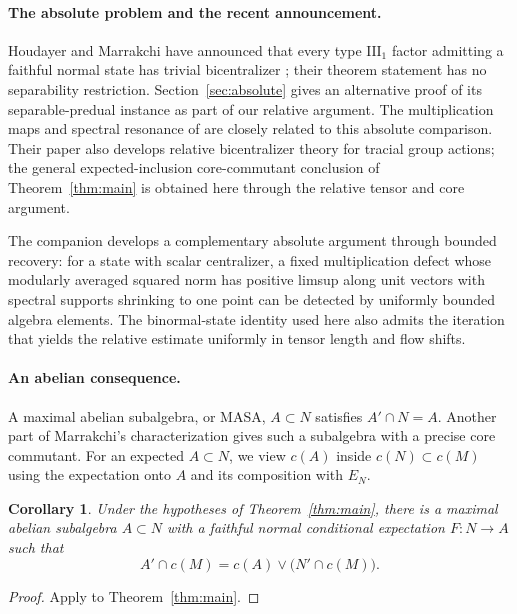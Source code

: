 \documentclass[11pt]{article}
\newtheorem{corollary}[theorem]{Corollary}
\theoremstyle{definition}
\begin{document}
\paragraph{The absolute problem and the recent announcement.}
Houdayer and Marrakchi have announced that every type $\mathrm{III}_1$
factor admitting a faithful normal state has trivial bicentralizer
\cite[Theorem~G]{HoudayerMarrakchi2026}; their theorem statement has no
separability restriction. Section~\ref{sec:absolute} gives an alternative
proof of its separable-predual instance as part of our relative argument.
The multiplication maps and spectral resonance of
\cite[Section~8]{HoudayerMarrakchi2026} are closely related to this
absolute comparison. Their paper also develops relative bicentralizer
theory for tracial group actions; the general expected-inclusion
core-commutant conclusion of Theorem~\ref{thm:main} is obtained here
through the relative tensor and core argument.

The companion \cite[Theorem~4.1 and Section~5.1]{BoundedRecovery}
develops a complementary absolute argument through bounded recovery:
for a state with scalar centralizer, a fixed multiplication defect whose
modularly averaged squared norm has positive limsup along unit vectors
with spectral supports shrinking to one point can be detected by uniformly
bounded algebra elements.
The binormal-state identity used here also admits the iteration that
yields the relative estimate uniformly in tensor length and flow shifts.

\paragraph{An abelian consequence.}
A maximal abelian subalgebra, or MASA, $A\subset N$ satisfies $A'\cap N=A$.
Another part of Marrakchi's characterization gives such a subalgebra with
a precise core commutant. For an expected $A\subset N$, we view $c(A)$
inside $c(N)\subset c(M)$ using the expectation onto $A$ and its composition
with $E_N$.

\begin{corollary}\label{cor:masa}
Under the hypotheses of Theorem~\ref{thm:main}, there is a maximal abelian
subalgebra $A\subset N$ with a faithful normal conditional expectation
$F:N\to A$ such that
\[
 A'\cap c(M)=c(A)\vee\bigl(N'\cap c(M)\bigr).
\]
\end{corollary}
\begin{proof}
Apply \cite[Theorem~D, (4)$\Rightarrow$(6)]{M1} to
Theorem~\ref{thm:main}.
\end{proof}
\end{document}
